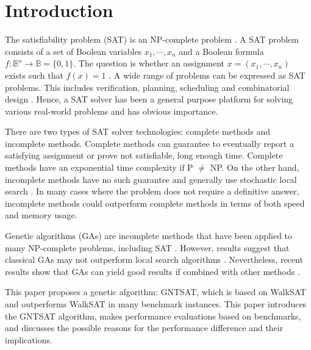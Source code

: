 \section{Introduction}
The satisfiability problem (SAT) is an NP-complete problem
\parencite{cook_1971}. A SAT problem consists of a set of Boolean variables
$x_1, \cdots, x_n$ and a Boolean formula $f: \mathbb{B}^n \rightarrow \mathbb{B}=\{0, 1\}$. The
question is whether an assignment $x=(x_1, \cdots, x_n)$ exists such that
$f(x)=1$ \parencite{gottlieb_marchiori_rossi_2002}. A wide range of problems can be
expressed as SAT problems. This includes verification, planning, scheduling
and combinatorial design \parencite{biere2009handbook}. Hence, a SAT solver has been a
general purpose platform for solving various real-world problems and has
obvious importance.

There are two types of SAT solver technologies: complete methods and
incomplete methods. Complete methods can guarantee to eventually report a
satisfying assignment or prove not satisfiable, long enough time.
Complete methods have an exponential time complexity if P
$\neq$ NP. On the other hand, incomplete methods have no such
guarantee and generally use stochastic local search \parencite{gomes_kautz_sabharwal_selman_2008}. In
many cases where the problem does not require a definitive answer, incomplete
methods could outperform complete methods in terms of both speed and memory
usage.

Genetic algorithms (GAs) are incomplete methods that have been applied to many
NP-complete problems, including SAT \parencite{gottlieb_marchiori_rossi_2002}. However, results
suggest that classical GAs may not outperform local search algorithms
\parencite{de1989using}. Nevertheless, recent results show that GAs can yield
good results if combined with other methods \parencite{gottlieb_marchiori_rossi_2002}.

This paper proposes a genetic algorithm: GNTSAT, which is based on WalkSAT
\parencite{selman1994noise} and outperforms WalkSAT in many benchmark instances.
This paper introduces the GNTSAT algorithm, makes performance evaluations
based on benchmarks, and discusses the possible reasons for the performance
difference and their implications.
